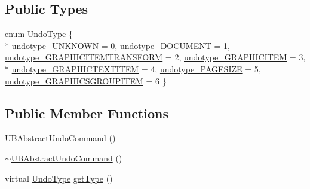\subsection*{Public Types}
\begin{DoxyCompactItemize}
\item 
enum \hyperlink{class_u_b_abstract_undo_command_a85016029bd4ceb03a8247b3c01e2bd97}{Undo\-Type} \{ \\*
\hyperlink{class_u_b_abstract_undo_command_a85016029bd4ceb03a8247b3c01e2bd97a306b69e4fb84d0f441c8af861abbeb41}{undotype\-\_\-\-U\-N\-K\-N\-O\-W\-N} =  0, 
\hyperlink{class_u_b_abstract_undo_command_a85016029bd4ceb03a8247b3c01e2bd97acacd422641e39f943d210ed4f56cc9cf}{undotype\-\_\-\-D\-O\-C\-U\-M\-E\-N\-T} =  1, 
\hyperlink{class_u_b_abstract_undo_command_a85016029bd4ceb03a8247b3c01e2bd97a7b18930cbc262a7933cbe58d673a54f7}{undotype\-\_\-\-G\-R\-A\-P\-H\-I\-C\-I\-T\-E\-M\-T\-R\-A\-N\-S\-F\-O\-R\-M} =  2, 
\hyperlink{class_u_b_abstract_undo_command_a85016029bd4ceb03a8247b3c01e2bd97ae0e409824d406d86a5cf28d295a37b46}{undotype\-\_\-\-G\-R\-A\-P\-H\-I\-C\-I\-T\-E\-M} =  3, 
\\*
\hyperlink{class_u_b_abstract_undo_command_a85016029bd4ceb03a8247b3c01e2bd97adc1fe02d56ec5ce6c48dffd06c86f713}{undotype\-\_\-\-G\-R\-A\-P\-H\-I\-C\-T\-E\-X\-T\-I\-T\-E\-M} =  4, 
\hyperlink{class_u_b_abstract_undo_command_a85016029bd4ceb03a8247b3c01e2bd97a741e9f23844ce319f14571b05e2bd27a}{undotype\-\_\-\-P\-A\-G\-E\-S\-I\-Z\-E} =  5, 
\hyperlink{class_u_b_abstract_undo_command_a85016029bd4ceb03a8247b3c01e2bd97a5cea4d24ef340a54010b5feebe022db1}{undotype\-\_\-\-G\-R\-A\-P\-H\-I\-C\-S\-G\-R\-O\-U\-P\-I\-T\-E\-M} =  6
 \}
\end{DoxyCompactItemize}
\subsection*{Public Member Functions}
\begin{DoxyCompactItemize}
\item 
\hyperlink{class_u_b_abstract_undo_command_a11268ac0f2d6d5d272b18f0a3863682c}{U\-B\-Abstract\-Undo\-Command} ()
\item 
\hyperlink{class_u_b_abstract_undo_command_a83bef389a8760e7e5fa1f9ecfebab016}{$\sim$\-U\-B\-Abstract\-Undo\-Command} ()
\item 
virtual \hyperlink{class_u_b_abstract_undo_command_a85016029bd4ceb03a8247b3c01e2bd97}{Undo\-Type} \hyperlink{class_u_b_abstract_undo_command_aea1857e5425cbb2c14b4ae58bf3b4d9c}{get\-Type} ()
\end{DoxyCompactItemize}

